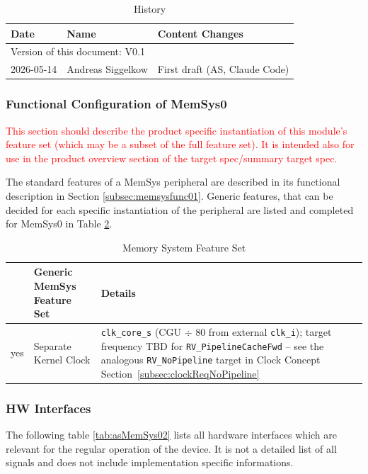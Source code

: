 \begin{table}[H]
\caption{History}
\label{tab:memsyshistory01a}
\centering
\begin{tabularx}{\textwidth}{|X |X |X |}
  \hline
  Date & Name & Content Changes \\
  \hline
  \multicolumn{3}{|l|}{Version of this document: V0.1} \\
  \hline
  2026-05-14 & Andreas Siggelkow & First draft (AS, Claude Code) \\
  \hline
\end{tabularx}
\end{table}

\subsubsection{Functional Configuration of MemSys0}
\textcolor{red}{This section should describe the product specific instantiation of this module’s feature set (which may be a subset of the full feature set). It is intended also for use in the product overview section of the target spec/summary target spec.}

The standard features of a MemSys peripheral are described in its functional description in Section \ref{subsec:memsysfunc01}. Generic features, that can be decided for each specific instantiation of the peripheral are listed and completed for MemSys0 in Table \ref{tab:asMemSys01a}.
\begin{table}[H]
\caption{Memory System Feature Set}
\label{tab:asMemSys01a}
\centering
\begin{tabularx}{\textwidth}{|l |l |X|}
  \hline
   & Generic MemSys Feature Set & Details \\
  \hline
  \hline
  yes & Separate Kernel Clock      & \texttt{clk\_core\_s} (CGU $\div$ 80 from external \texttt{clk\_i});
    target frequency TBD for \texttt{RV\_PipelineCacheFwd} -- see the
    analogous \texttt{RV\_NoPipeline} target in Clock Concept
    Section~\ref{subsec:clockReqNoPipeline} \\
  \hline
\end{tabularx}
\end{table}

\subsubsection{HW Interfaces}
The following table \ref{tab:asMemSys02} lists all hardware interfaces which are relevant for the regular operation of the device. It is not a detailed list of all signals and does not include implementation specific informations.

